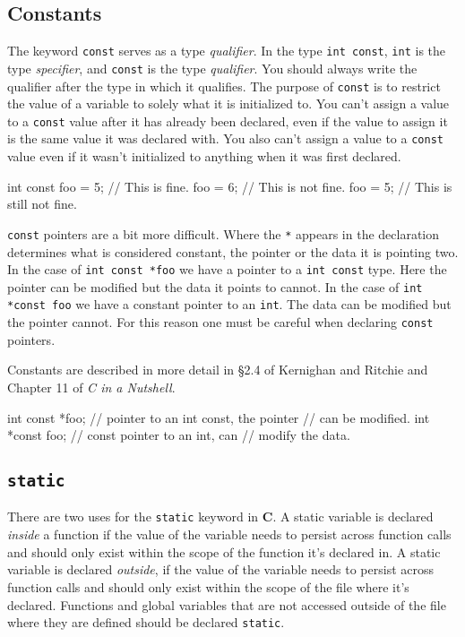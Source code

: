 \documentclass[11pt]{article}
\begin{document}
\subsection{Constants}

The keyword \texttt{const} serves as a type \emph{qualifier}. In the type
\texttt{int const}, \texttt{int} is the type \emph{specifier}, and
\texttt{const} is the type \emph{qualifier}. You should always write the qualifier after the type in
which it qualifies.  The purpose of \texttt{const} is to restrict the value of a
variable to solely what it is initialized to. You can't assign a value to a
\texttt{const} value after it has already been declared, even if the value to
assign it is the same value it was declared with. You also can't assign a value
to a \texttt{const} value even if it wasn't initialized to anything when it was
first declared.

\begin{clisting}{}
int const foo = 5;  // This is fine.
foo = 6;            // This is not fine.
foo = 5;            // This is still not fine.
\end{clisting}

\noindent \texttt{const} pointers are a bit more difficult. Where the \texttt{*} appears
in the declaration determines what is considered constant, the pointer or the
data it is pointing two. In the case of \texttt{int const *foo} we have a
pointer to a \texttt{int const} type. Here the pointer can be modified but the
data it points to cannot. In the case of \texttt{int *const foo} we have a
constant pointer to an \texttt{int}. The data can be modified but the pointer
cannot. For this reason one must be careful when declaring \texttt{const}
pointers.

Constants are described in more detail in \S 2.4 of Kernighan and Ritchie and
Chapter 11 of \emph{C in a Nutshell}.

\begin{clisting}{}
int const *foo; // pointer to an int const, the pointer
                // can be modified.
int *const foo; // const pointer to an int, can
                // modify the data.
\end{clisting}


\subsection{\texttt{static}}

There are two uses for the \texttt{static} keyword in \textbf{C}. A static
variable is declared \emph{inside} a function if the value of the variable needs
to persist across function calls and should only exist within the scope of the
function it's declared in. A static variable is declared \emph{outside}, if the
value of the variable needs to persist across function calls and should only
exist within the scope of the file where it's declared.  Functions and global
variables that are not accessed outside of the file where they are defined
should be declared \texttt{static}.
\end{document}
